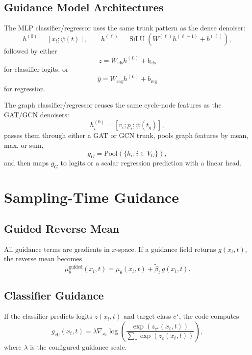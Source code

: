 \documentclass[11pt]{article}
\newcommand{\SiLU}{\operatorname{SiLU}}
\begin{document}
\subsection{Guidance Model Architectures}
The MLP classifier/regressor uses the same trunk pattern as the dense denoiser:
\begin{equation}
h^{(0)} = [x_t ; \psi(t)],
\qquad
h^{(\ell)} = \SiLU(W^{(\ell)} h^{(\ell-1)} + b^{(\ell)}),
\end{equation}
followed by either
\begin{equation}
z = W_{\mathrm{cls}} h^{(L)} + b_{\mathrm{cls}}
\end{equation}
for classifier logits, or
\begin{equation}
\hat{y} = W_{\mathrm{reg}} h^{(L)} + b_{\mathrm{reg}}
\end{equation}
for regression.

The graph classifier/regressor reuses the same cycle-node features as the GAT/GCN denoisers:
\begin{equation}
h_i^{(0)} = [v_i ; p_i ; \psi(t_g)],
\end{equation}
passes them through either a GAT or GCN trunk, pools graph features by mean, max, or sum,
\begin{equation}
g_G = \mathrm{Pool}\left(\{h_i : i \in V_G\}\right),
\end{equation}
and then maps $g_G$ to logits or a scalar regression prediction with a linear head.

\section{Sampling-Time Guidance}
\subsection{Guided Reverse Mean}
All guidance terms are gradients in $x$-space. If a guidance field returns $g(x_t,t)$, the reverse mean becomes
\begin{equation}
\mu_\theta^{\mathrm{guided}}(x_t,t)
=
\mu_\theta(x_t,t) + \tilde{\beta}_t\,g(x_t,t).
\end{equation}

\subsection{Classifier Guidance}
If the classifier predicts logits $z(x_t,t)$ and target class $c^\star$, the code computes
\begin{equation}
g_{\mathrm{clf}}(x_t,t)
=
\lambda \nabla_{x_t}
\log
\left(
\frac{\exp(z_{c^\star}(x_t,t))}
{\sum_c \exp(z_c(x_t,t))}
\right),
\end{equation}
where $\lambda$ is the configured guidance scale.
\end{document}
